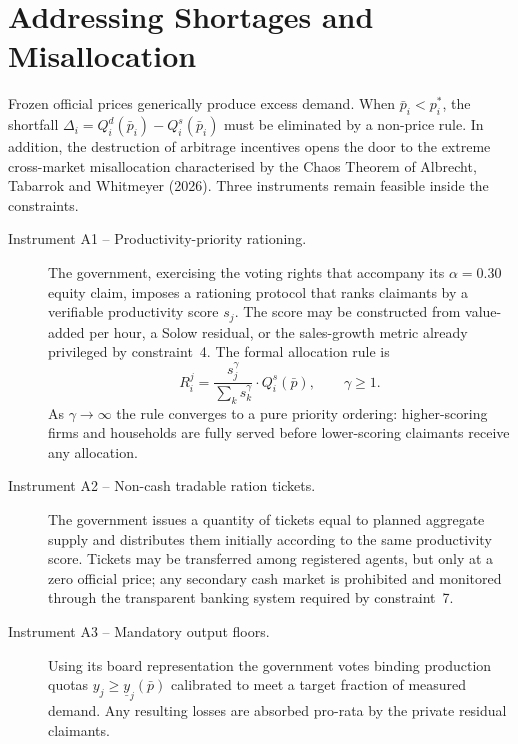 \documentclass[12pt,anyside]{book}
\theoremstyle{definition}
\theoremstyle{plain}
\theoremstyle{remark}
\begin{document}
\section{Addressing Shortages and Misallocation}

Frozen official prices generically produce excess demand. When $\bar{p}_i<p_i^*$, the shortfall $\Delta_i=Q_i^d(\bar{p}_i)-Q_i^s(\bar{p}_i)$ must be eliminated by a non-price rule. In addition, the destruction of arbitrage incentives opens the door to the extreme cross-market misallocation characterised by the Chaos Theorem of Albrecht, Tabarrok and Whitmeyer (2026). Three instruments remain feasible inside the constraints.

\begin{description}
\item[Instrument A1 -- Productivity-priority rationing.]  
The government, exercising the voting rights that accompany its $\alpha=0.30$ equity claim, imposes a rationing protocol that ranks claimants by a verifiable productivity score $s_j$. The score may be constructed from value-added per hour, a Solow residual, or the sales-growth metric already privileged by constraint~4. The formal allocation rule is
\begin{equation}
R_i^j=\frac{s_j^\gamma}{\sum_k s_k^\gamma}\cdot Q_i^s(\bar{p}),\qquad\gamma\ge1.
\end{equation}
As $\gamma\to\infty$ the rule converges to a pure priority ordering: higher-scoring firms and households are fully served before lower-scoring claimants receive any allocation.

\item[Instrument A2 -- Non-cash tradable ration tickets.]  
The government issues a quantity of tickets equal to planned aggregate supply and distributes them initially according to the same productivity score. Tickets may be transferred among registered agents, but only at a zero official price; any secondary cash market is prohibited and monitored through the transparent banking system required by constraint~7.

\item[Instrument A3 -- Mandatory output floors.]  
Using its board representation the government votes binding production quotas $y_j\ge\underline{y}_j(\bar{p})$ calibrated to meet a target fraction of measured demand. Any resulting losses are absorbed pro-rata by the private residual claimants.
\end{description}
\end{document}
